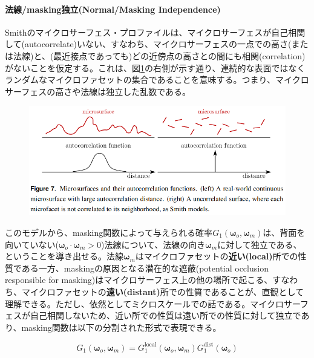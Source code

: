 \documentclass[a4j,xelatex,ja=standard]{bxjsarticle}
\begin{document}
\paragraph{法線/masking独立(Normal/Masking Independence)}

Smithのマイクロサーフェス・プロファイルは、マイクロサーフェスが自己相関して(autocorrelate)いない、すなわち、マイクロサーフェスの一点での高さ(または法線)と、(最近接点であっても)どの近傍点の高さとの間にも相関(correlation)がないことを仮定する。これは、図\ref{fig:7}の右側が示す通り、連続的な表面ではなくランダムなマイクロファセットの集合であることを意味する。つまり、マイクロサーフェスの高さや法線は独立した乱数である。

\begin{figure}
    \includegraphics[width=\textwidth]{Figure7.png}
    \caption{}
    \label{fig:7}
\end{figure}

このモデルから、masking関数によって与えられる確率$G_1(\boldsymbol{\omega}_o, \boldsymbol{\omega}_m)$は、背面を向いていない($\boldsymbol{\omega}_o \cdot \boldsymbol{\omega}_m > 0$)法線について、法線の向き$\boldsymbol{\omega}_m$に対して独立である、ということを導き出せる。法線$\boldsymbol{\omega}_m$はマイクロファセットの\textbf{近い(local)}所での性質である一方、maskingの原因となる潜在的な遮蔽(potential occlusion responsible for masking)はマイクロサーフェス上の他の場所で起こる、すなわち、マイクロファセットの\textbf{遠い(distant)}所での性質であることが、直観として理解できる。ただし、依然としてミクロスケールでの話である。マイクロサーフェスが自己相関しないため、近い所での性質は遠い所での性質に対して独立であり、masking関数は以下の分割された形式で表現できる。

\begin{equation}
    G_1(\boldsymbol{\omega}_o, \boldsymbol{\omega}_m) = G_1^{\text{local}}(\boldsymbol{\omega}_o, \boldsymbol{\omega}_m) G_1^{\text{dist}}(\boldsymbol{\omega}_o)
    \label{eq:38}
\end{equation}
\end{document}
